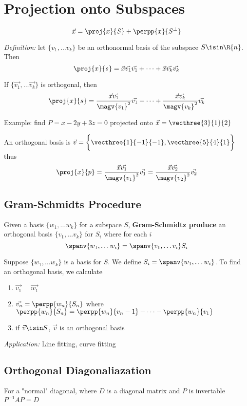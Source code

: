 \documentclass[12pt]{article}
\begin{document}
\section*{Projection onto Subspaces}
\[ \vec{x} = \proj{x}{S} + \perpp{x}{S^\perp} \]

\textit{Definition:} let $\{v_1,\dots v_k\}$ be an orthonormal basis of the subspace $S\isin\R{n}$. Then \[ \proj{x}{s} = \vec{x}\vec{v_1}\vec{v_1} + \dots + \vec{x}\vec{v_k}\vec{v_k} \]

If $\{\vec{v_1},\dots \vec{v_k}\}$ is orthogonal, then \[ \proj{x}{s} = \frac{\vec{x}\vec{v_1}}{\magv{v_1}^2}\vec{v_1} + \dots + \frac{\vec{x}\vec{v_k}}{\magv{v_k}^2}\vec{v_k} \]

Example: find $P = x -2y + 3z = 0$ projected onto $\vec{x} = \vecthree{3}{1}{2}$

An orthogonal basis is $\vec{v} = \bigg\{ \vecthree{1}{-1}{-1},\vecthree{5}{4}{1} \bigg\}$ thus \[ \proj{x}{p} = \frac{\vec{x}\vec{v_1}}{\magv{v_1}^2}\vec{v_1} = \frac{\vec{x}\vec{v_2}}{\magv{v_2}^2}\vec{v_2} \]


\subsection*{Gram-Schmidts Procedure}
Given a basis $\{w_1,\dots w_k\}$ for a subspace $S$, {\bf Gram-Schmidtz produce} an orthogonal basis $\{v_1,\dots v_k\}$ for $S_i$ where for each $i$ \[ \spanv{w_1,\dots w_i} = \spanv{v_1,\dots v_i}S_i \]

Suppose $\{w_1,\dots w_k\}$ is a basis for $S$. We define $S_i = \spanv{w_1,\dots w_i}$. To find an orthogonal basis, we calculate
\begin{enumerate}
\item $\vec{v_1} = \vec{w_1}$
\item $\vec{v_n} = \perpp{w_n}{S_n}$ where $\perpp{w_n}{S_n} = \perpp{w_n}{v_n-1} - \dots - \perpp{w_n}{v_1}$
\item if $\vec{v}\isin S$, $\vec{v}$ is an orthogonal basis
\end{enumerate}

\textit{Application:} Line fitting, curve fitting

\subsection*{Orthogonal Diagonaliazation}
For a "normal" diagonal, where $D$ is a diagonal matrix and $P$ is invertable $P^{-1}AP = D$
\end{document}
